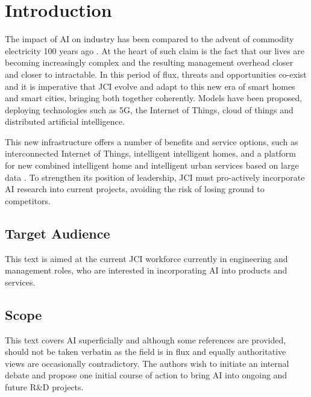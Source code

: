 \section{Introduction}

The impact of AI on industry has been compared to the advent of commodity electricity 100 years ago \cite{ShanaLynch}. At the heart of such claim is the fact that our lives are becoming increasingly complex and the resulting management overhead closer and closer to intractable.  
In this period of flux, threats and opportunities co-exist and it is imperative that JCI evolve and adapt to this new era of smart homes and smart cities, bringing both together coherently. Models have been proposed, deploying technologies such as 5G, the Internet of Things, cloud of things and distributed artificial intelligence. 

This new infrastructure offers a number of benefits and service options, such as interconnected Internet of Things, intelligent intelligent homes, and a platform for new combined intelligent home and intelligent urban services based on large data \cite{7019822}. To strengthen its position of leadership, JCI must pro-actively incorporate AI research into current projects, avoiding the risk of losing ground to competitors.  

\subsection{Target Audience}

This text is aimed at the current JCI workforce currently in engineering and management roles, who are interested in incorporating AI into products and services.

\subsection{Scope}

This text covers AI superficially and although some references are provided, should not be taken verbatin as the field is in flux and equally authoritative views are occasionally contradictory. The authors wish to initiate an internal debate and propose one initial course of action to bring AI into ongoing and future R\&D projects.




